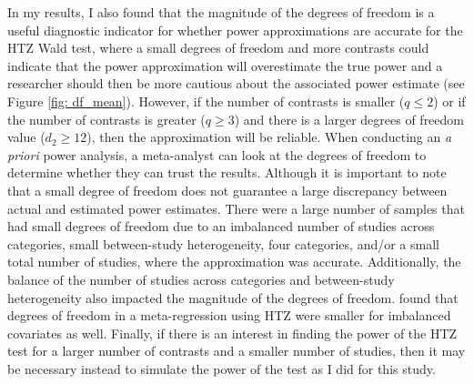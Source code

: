 In my results, I also found that the magnitude of the degrees of freedom is a useful diagnostic indicator for whether power approximations are accurate for the HTZ Wald test, where a small degrees of freedom and more contrasts could indicate that the power approximation will overestimate the true power and a researcher should then be more cautious about the associated power estimate (see Figure \ref{fig: df_mean}). However, if the number of contrasts is smaller ($q \leq 2$) or if the number of contrasts is greater ($q \geq 3$) and there is a larger degrees of freedom value ($d_2 \geq 12$), then the approximation will be reliable. When conducting an \textit{a priori} power analysis, a meta-analyst can look at the degrees of freedom to determine whether they can trust the results. Although it is important to note that a small degree of freedom does not guarantee a large discrepancy between actual and estimated power estimates. There were a large number of samples that had small degrees of freedom due to an imbalanced number of studies across categories, small between-study heterogeneity, four categories, and/or a small total number of studies, where the approximation was accurate. Additionally, the balance of the number of studies across categories and between-study heterogeneity also impacted the magnitude of the degrees of freedom. \textcite{tipton2015b} found that degrees of freedom in a meta-regression using HTZ were smaller for imbalanced covariates as well. Finally, if there is an interest in finding the power of the HTZ test for a larger number of contrasts and a smaller number of studies, then it may be necessary instead to simulate the power of the test as I did for this study. 




